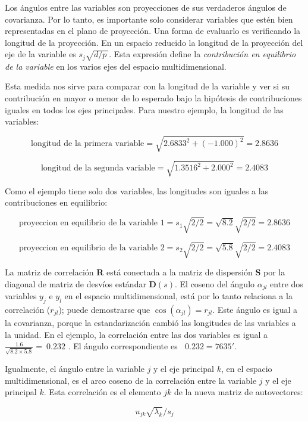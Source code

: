 \documentclass[]{book}
\theoremstyle{definition}
\theoremstyle{definition}
\theoremstyle{definition}
\theoremstyle{remark}
\begin{document}
Los ángulos entre las variables son proyecciones de sus verdaderos
ángulos de covarianza. Por lo tanto, es importante solo considerar
variables que estén bien representadas en el plano de proyección. Una
forma de evaluarlo es verificando la longitud de la proyección. En un
espacio reducido la longitud de la proyección del eje de la variable es
\(s_{j}\sqrt{d/p\ }\). Esta expresión define la \emph{contribución en
equilibrio de la variable} en los varios ejes del espacio
multidimensional.

Esta medida nos sirve para comparar con la longitud de la variable y ver
si su contribución en mayor o menor de lo esperado bajo la hipótesis de
contribuciones iguales en todos los ejes principales. Para nuestro
ejemplo, la longitud de las variables:

\[
\text{longitud de la primera variable} = \sqrt{{2.6833}^{2} + \left( - 1.000 \right)^{2}} = 2.8636
\]

\[
\text{longitud de la segunda variable} = \sqrt{{1.3516}^{2} + {2.000}^{2}} = 2.4083
\]

Como el ejemplo tiene solo dos variables, las longitudes son iguales a
las contribuciones en equilibrio:

\[
\text{proyeccion en equilibrio de la variable 1} = s_{1}\sqrt{2/2} = \sqrt{8.2}\sqrt{2/2} = 2.8636
\]

\[
\text{proyeccion en equilibrio de la variable 2} = s_{2}\sqrt{2/2} = \sqrt{5.8}\sqrt{2/2} = 2.4083
\]

La matriz de correlación \(\mathbf{R}\) está conectada a la matriz de
dispersión \(\mathbf{S}\) por la diagonal de matriz de desvíos estándar
\(\mathbf{D}(s)\). El coseno del ángulo \(\alpha_{jl}\) entre dos
variables \(y_{j}\) e \(y_{l}\) en el espacio multidimensional, está por
lo tanto relaciona a la correlación (\(r_{jl}\)); puede demostrarse que
\(\cos\left( \alpha_{jl} \right) = r_{jl}\). Este ángulo es igual a la
covarianza, porque la estandarización cambió las longitudes de las
variables a la unidad. En el ejemplo, la correlación entre las dos
variables es igual a \(\frac{1.6}{\sqrt{8.2 \times 5.8}} = \ 0.232\) .
El ángulo correspondiente es \(\operatorname{}{0.232} = 7635'\).

Igualmente, el ángulo entre la variable \(j\) y el eje principal \(k\),
en el espacio multidimensional, es el arco coseno de la correlación
entre la variable \(j\) y el eje principal \(k\). Esta correlación es el
elemento \(jk\) de la nueva matriz de autovectores:

\[
u_{jk}\sqrt{\lambda_{k}}/s_{j}
\]
\end{document}
